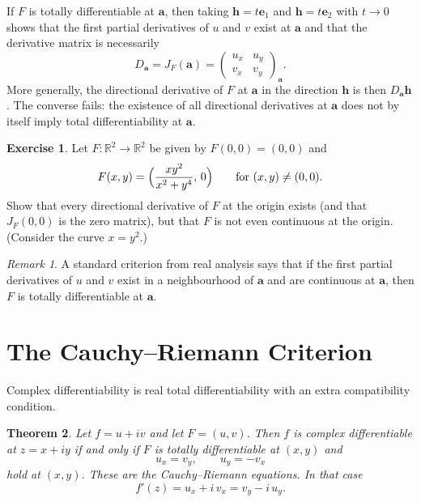 \documentclass[11pt]{article}
\theoremstyle{plain}
\newtheorem{theorem}{Theorem}[section]
\theoremstyle{definition}
\newtheorem{exercise}[theorem]{Exercise}
\theoremstyle{remark}
\newtheorem*{remark}{Remark}
\numberwithin{equation}{section}
\newcommand{\be}{\begin{equation}}
\newcommand{\ee}{\end{equation}}
\newcommand{\R}{\mathbb{R}}
\begin{document}
If $F$ is totally differentiable at $\mathbf a$, then taking
$\mathbf h=t\mathbf e_1$ and $\mathbf h=t\mathbf e_2$ with $t\to0$ shows
that the first partial derivatives of $u$ and $v$ exist at $\mathbf a$
and that the derivative matrix is necessarily
\be
  D_{\mathbf a}=J_F(\mathbf a)
  =\begin{pmatrix}
      u_x&u_y\\
      v_x&v_y
    \end{pmatrix}_{\mathbf a}.
\ee
More generally, the directional derivative of $F$ at $\mathbf a$ in the
direction $\mathbf h$ is then $D_{\mathbf a}\mathbf h$.  The converse
fails: the existence of all directional derivatives at $\mathbf a$
does not by itself imply total differentiability at $\mathbf a$.

\begin{exercise}
Let $F:\R^2\to\R^2$ be given by $F(0,0)=(0,0)$ and
\[
  F(x,y)=\Bigl(\frac{xy^2}{x^2+y^4},\,0\Bigr)
  \qquad\text{for }(x,y)\ne(0,0).
\]
Show that every directional derivative of $F$ at the origin exists
(and that $J_F(0,0)$ is the zero matrix), but that $F$ is not even
continuous at the origin.  (Consider the curve $x=y^2$.)
\end{exercise}

\begin{remark}
A standard criterion from real analysis says that if the first partial
derivatives of $u$ and $v$ exist in a neighbourhood of $\mathbf a$ and
are continuous at $\mathbf a$, then $F$ is totally differentiable at
$\mathbf a$.
\end{remark}


\section{The Cauchy--Riemann Criterion} \label{sec:CR}

Complex differentiability is real total differentiability with an extra
compatibility condition.



\begin{theorem}\label{thm:CR}
	Let $f=u+iv$ and let $F=(u,v)$.  Then $f$ is complex differentiable at
	$z=x+iy$ if and only if $F$ is totally differentiable at $(x,y)$ and
	\be
	\boxed{
		u_x=v_y,
		\qquad
		u_y=-v_x
	}
	\ee
	hold at $(x,y)$.  These are the \emph{Cauchy--Riemann equations}.  In
	that case
	\be
	f'(z)=u_x+i\,v_x=v_y-i\,u_y .
	\ee
\end{theorem}
\end{document}
